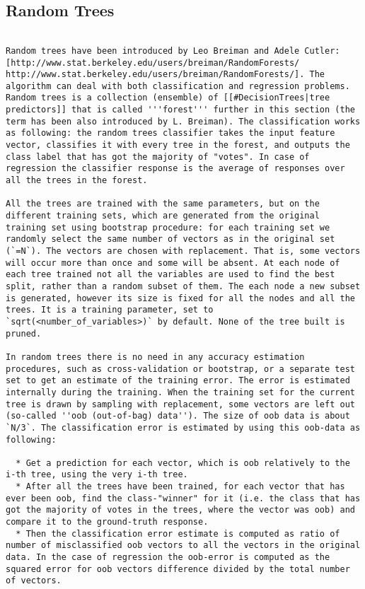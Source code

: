 \subsection{Random Trees}
\begin{verbatim}

Random trees have been introduced by Leo Breiman and Adele Cutler: [http://www.stat.berkeley.edu/users/breiman/RandomForests/  http://www.stat.berkeley.edu/users/breiman/RandomForests/]. The algorithm can deal with both classification and regression problems. Random trees is a collection (ensemble) of [[#DecisionTrees|tree predictors]] that is called '''forest''' further in this section (the term has been also introduced by L. Breiman). The classification works as following: the random trees classifier takes the input feature vector, classifies it with every tree in the forest, and outputs the class label that has got the majority of "votes". In case of regression the classifier response is the average of responses over all the trees in the forest.

All the trees are trained with the same parameters, but on the different training sets, which are generated from the original training set using bootstrap procedure: for each training set we randomly select the same number of vectors as in the original set (`=N`). The vectors are chosen with replacement. That is, some vectors will occur more than once and some will be absent. At each node of each tree trained not all the variables are used to find the best split, rather than a random subset of them. The each node a new subset is generated, however its size is fixed for all the nodes and all the trees. It is a training parameter, set to `sqrt(<number_of_variables>)` by default. None of the tree built is pruned.

In random trees there is no need in any accuracy estimation procedures, such as cross-validation or bootstrap, or a separate test set to get an estimate of the training error. The error is estimated internally during the training. When the training set for the current tree is drawn by sampling with replacement, some vectors are left out (so-called ''oob (out-of-bag) data''). The size of oob data is about `N/3`. The classification error is estimated by using this oob-data as following:

  * Get a prediction for each vector, which is oob relatively to the i-th tree, using the very i-th tree.
  * After all the trees have been trained, for each vector that has ever been oob, find the class-"winner" for it (i.e. the class that has got the majority of votes in the trees, where the vector was oob) and compare it to the ground-truth response.
  * Then the classification error estimate is computed as ratio of number of misclassified oob vectors to all the vectors in the original data. In the case of regression the oob-error is computed as the squared error for oob vectors difference divided by the total number of vectors.


\end{verbatim}
